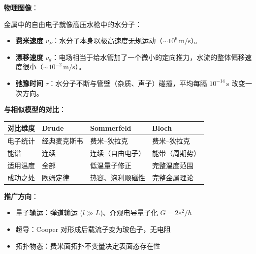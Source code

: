 \begin{insightbox}[物理图像与模型关联]
\textbf{物理图像}：

金属中的自由电子就像高压水枪中的水分子：
\begin{itemize}[nosep]
    \item \textbf{费米速度} $v_F$：水分子本身以极高速度无规运动（$\sim10^6\,\text{m/s}$）。
    \item \textbf{漂移速度} $v_d$：电场相当于给水管加了一个微小的定向推力，水流的整体偏移速度很小（$\sim10^{-2}\,\text{m/s}$）。
    \item \textbf{弛豫时间} $\tau$：水分子不断与管壁（杂质、声子）碰撞，平均每隔 $10^{-14}\,\text{s}$ 改变一次方向。
\end{itemize}

\textbf{与相似模型的对比}：
\begin{center}
\begin{tabular}{llll}
\toprule
\textbf{对比维度} & \textbf{Drude} & \textbf{Sommerfeld} & \textbf{Bloch} \\
\midrule
电子统计 & 经典麦克斯韦 & 费米--狄拉克 & 费米--狄拉克 \\
能谱 & 连续 & 连续（自由电子） & 能带（周期势） \\
适用温度 & 全部 & 低温量子修正 & 完整温度范围 \\
成功之处 & 欧姆定律 & 热容、泡利顺磁性 & 完整金属理论 \\
\bottomrule
\end{tabular}
\end{center}

\textbf{推广方向}：
\begin{itemize}[nosep]
    \item 量子输运：弹道输运 ($l\gg L$)、介观电导量子化 $G=2e^2/h$
    \item 超导：Cooper 对形成后载流子变为玻色子，无电阻
    \item 拓扑物态：费米面拓扑不变量决定表面态存在性
\end{itemize}
\end{insightbox}


